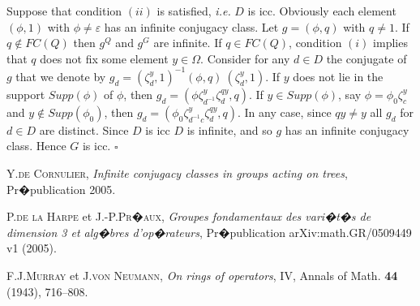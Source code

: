 \documentclass[12pt,oneside]{amsart}
\def\e{\varepsilon}
\def\f{\phi}
\begin{document}
Suppose that condition $(ii)$ is satisfied, \emph{i.e.} $D$ is
icc. Obviously each element $(\f,1)$ with $\f\not=\e$ has an
infinite conjugacy class. Let $g=(\f,q)$ with $q\not=1$. If
$q\not\in FC(Q)$ then $g^Q$ and $g^G$ are infinite. If $q\in
FC(Q)$, condition $(i)$ implies that $q$ does not fix some element
$y\in\Omega$.
%
Consider for any $d\in D$ the conjugate of $g$ that we denote by
$g_d=(\zeta_d^y,1)^{-1}(\f,q)\ (\zeta_d^y,1)$. If $y$ does not lie
in the support $Supp(\f)$ of $\f$, then
$g_d=(\f\zeta_{d^{-1}}^y\zeta_d^{qy},q)$. If $y\in Supp(\f)$, say
$\f=\f_0\zeta_c^y$ and $y\not\in Supp(\f_0)$, then
$g_d=(\f_0\zeta_{d^{-1}c}^y\zeta_d^{qy},q)$. In any case, since
$qy\not= y$ all $g_d$ for $d\in D$ are distinct. Since $D$ is icc
$D$ is infinite, and so $g$ has an infinite conjugacy class. Hence
$G$ is icc.
 \hfill$\square$



\begin{comment}
\end{comment}


\begin{thebibliography}{mot}

Y.\textsc{de Cornulier}, \emph{Infinite conjugacy classes in
groups acting on trees}, Pr�publication 2005.


P.\textsc{de la Harpe} et J.-P.\textsc{Pr�aux}, \emph{Groupes
fondamentaux des vari�t�s de dimension 3 et alg�bres
d'op�rateurs}, Pr�publication arXiv:math.GR/0509449 v1 (2005).


F.J.\textsc{Murray} et J.\textsc{von Neumann}, \emph{On rings of
operators}, IV, Annals of Math. {\bf 44} (1943), 716--808.

\end{thebibliography}


 
\end{document}
